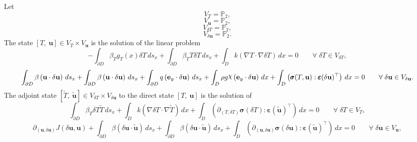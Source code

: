 \documentclass[preview]{standalone}
\let\oldcdot\cdot
\let\cdot\oldcdot
\begin{document}
Let
\begin{equation*}
V_{T} = \mathbb P_{2},\end{equation*}
\begin{equation*}
V_{{\mathbf{ u }}} = \mathbb P_{2},\end{equation*}
\begin{equation*}
V_{\delta T} = \mathbb P_{2},\end{equation*}
\begin{equation*}
V_{{\delta\mathbf{  u }}} = \mathbb P_{2}.\end{equation*}
The state $\left[ T, \  {\mathbf{ u }}\right] \in  V_{T}\times V_{{\mathbf{ u }}}$ is the solution of the linear problem
\begin{dmath*}
-  \int_{\partial D} \beta_{T} g_{T}(x) \delta T \,ds_x +  \int_{\partial D} \beta_{T} T \delta T \,ds_x +  \int_{D} k \left(  \nabla T  \cdot  \nabla \delta T  \right) \,dx = 0\qquad \forall\; {\delta T\in V_{\delta T}} , 
\end{dmath*}
\begin{dmath*}
 \int_{\partial D} \beta \left( {\mathbf{ u }} \cdot {\delta\mathbf{  u }} \right) \,ds_x +  \int_{\partial D} \beta \left( {\mathbf{ u }} \cdot {\delta\mathbf{  u }} \right) \,ds_x +  \int_{\partial D} q \left( \mathbf e_y \cdot {\delta\mathbf{  u }} \right) \,ds_x +  \int_{D} \rho g \raisebox{\depth}{$\chi$} \left( \mathbf e_y \cdot {\delta\mathbf{  u }} \right) \,dx +  \int_{D} \left( \pmb\sigma(T,{\mathbf{ u }}) \mathrel{:}  \pmb\varepsilon({\delta\mathbf{  u }})^\top  \right) \,dx = 0\qquad \forall\; {{\delta\mathbf{  u }}\in V_{{\delta\mathbf{  u }}}} . 
\end{dmath*}
The adjoint state $\left[ \tilde T, \  \tilde{\mathbf{ u }}\right] \in  V_{\delta T}\times V_{{\delta\mathbf{  u }}}$ to the direct state $\left[ T, \  {\mathbf{ u }}\right]$ is the solution of
\begin{dmath*}
 \int_{\partial D} \beta_{T} \delta T \tilde T \,ds_x +  \int_{D} k \left(  \nabla \delta T  \cdot  \nabla \tilde T  \right) \,dx +  \int_{D} \left( \partial_{(T,\delta T)} \pmb\sigma(\delta T) \mathrel{:}  \pmb\varepsilon(\tilde{\mathbf{ u }})^\top  \right) \,dx = 0\qquad \forall\; {\delta T\in V_{T}} , 
\end{dmath*}
\begin{dmath*}
\partial_{({\mathbf{ u }},{\delta\mathbf{  u }})} J({\delta\mathbf{  u }},{\mathbf{ u }}) +  \int_{\partial D} \beta \left( {\delta\mathbf{  u }} \cdot \tilde{\mathbf{ u }} \right) \,ds_x +  \int_{\partial D} \beta \left( {\delta\mathbf{  u }} \cdot \tilde{\mathbf{ u }} \right) \,ds_x +  \int_{D} \left( \partial_{({\mathbf{ u }},{\delta\mathbf{  u }})} \pmb\sigma({\delta\mathbf{  u }}) \mathrel{:}  \pmb\varepsilon(\tilde{\mathbf{ u }})^\top  \right) \,dx = 0\qquad \forall\; {{\delta\mathbf{  u }}\in V_{{\mathbf{ u }}}} , 
\end{dmath*}
\end{document}
